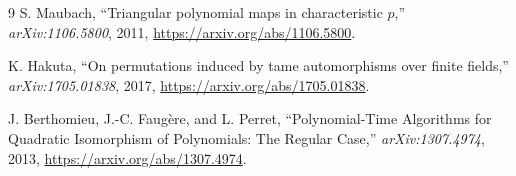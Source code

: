 \documentclass[11pt]{article}
\begin{document}
\begin{thebibliography}{9}
S. Maubach, ``Triangular polynomial maps in characteristic $p$,''
\emph{arXiv:1106.5800}, 2011,
\url{https://arxiv.org/abs/1106.5800}.

K. Hakuta, ``On permutations induced by tame automorphisms over finite
fields,'' \emph{arXiv:1705.01838}, 2017,
\url{https://arxiv.org/abs/1705.01838}.

J. Berthomieu, J.-C. Faug\`ere, and L. Perret,
``Polynomial-Time Algorithms for Quadratic Isomorphism of Polynomials: The
Regular Case,'' \emph{arXiv:1307.4974}, 2013,
\url{https://arxiv.org/abs/1307.4974}.
\end{thebibliography}
\end{document}
